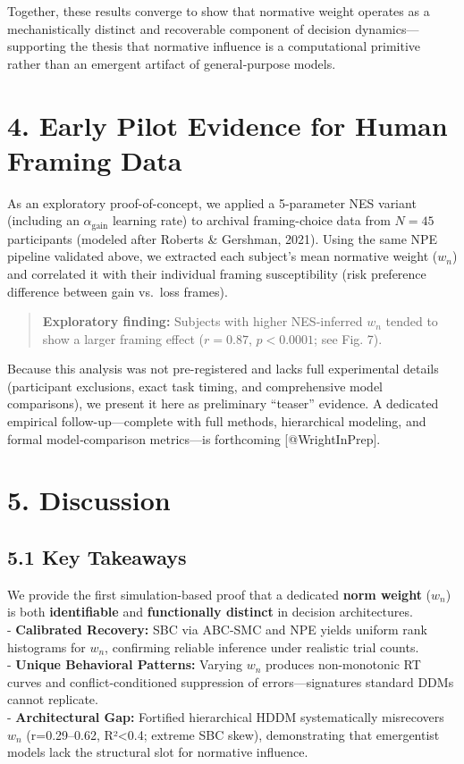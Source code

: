 \documentclass[
  11pt,
]{article}
\begin{document}
Together, these results converge to show that normative weight operates
as a mechanistically distinct and recoverable component of decision
dynamics---supporting the thesis that normative influence is a
computational primitive rather than an emergent artifact of
general‐purpose models.

\section{4. Early Pilot Evidence for Human Framing
Data}\label{early-pilot-evidence-for-human-framing-data}

As an exploratory proof-of-concept, we applied a 5-parameter NES variant
(including an \(\alpha_{\text{gain}}\) learning rate) to archival
framing-choice data from \(N=45\) participants (modeled after Roberts \&
Gershman, 2021). Using the same NPE pipeline validated above, we
extracted each subject's mean normative weight (\(w_n\)) and correlated
it with their individual framing susceptibility (risk preference
difference between gain vs.~loss frames).

\begin{quote}
\textbf{Exploratory finding:} Subjects with higher NES-inferred \(w_n\)
tended to show a larger framing effect (\(r=0.87\), \(p<0.0001\); see
Fig. 7).
\end{quote}

Because this analysis was not pre-registered and lacks full experimental
details (participant exclusions, exact task timing, and comprehensive
model comparisons), we present it here as preliminary ``teaser''
evidence. A dedicated empirical follow-up---complete with full methods,
hierarchical modeling, and formal model‐comparison metrics---is
forthcoming {[}@WrightInPrep{]}.

\section{5. Discussion}\label{discussion}

\subsection{5.1 Key Takeaways}\label{key-takeaways}

We provide the first simulation-based proof that a dedicated
\textbf{norm weight} (\(w_n\)) is both \textbf{identifiable} and
\textbf{functionally distinct} in decision architectures.\\
- \textbf{Calibrated Recovery:} SBC via ABC-SMC and NPE yields uniform
rank histograms for \(w_n\), confirming reliable inference under
realistic trial counts.\\
- \textbf{Unique Behavioral Patterns:} Varying \(w_n\) produces
non-monotonic RT curves and conflict-conditioned suppression of
errors---signatures standard DDMs cannot replicate.\\
- \textbf{Architectural Gap:} Fortified hierarchical HDDM systematically
misrecovers \(w_n\) (r=0.29--0.62, R²\textless0.4; extreme SBC skew),
demonstrating that emergentist models lack the structural slot for
normative influence.
\end{document}
